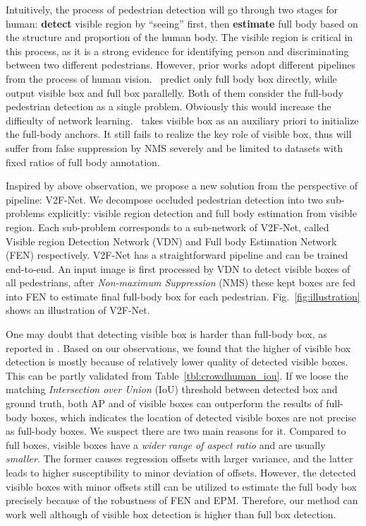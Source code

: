 \documentclass[10pt,twocolumn,letterpaper]{article}
\begin{document}
Intuitively, the process of pedestrian detection will go through two stages for human: \textbf{detect} visible region by ``seeing'' first, then \textbf{estimate} full body based on the structure and proportion of the human body. The visible region is critical in this process, as it is a strong evidence for identifying person and discriminating between two different pedestrians. However, prior works adopt different pipelines from the process of human vision.~\cite{wang2018repulsion, chu2020crowddet} predict only full body box directly, while~\cite{Zhou_2018_bibox, huang2020R2nms} output visible box and full box parallelly. Both of them consider the full-body pedestrian detection as a single problem. Obviously this would increase the difficulty of network learning.~\cite{prnet} takes visible box as an auxiliary priori to initialize the full-body anchors. It still fails to realize the
key role of visible box, thus will suffer from false suppression by NMS severely and be limited to datasets with fixed ratios of full body annotation.














Inspired by above observation, we propose a new solution from the perspective of pipeline: V2F-Net. We decompose occluded pedestrian detection into two sub-problems explicitly: visible region detection and full body estimation from visible region. Each sub-problem corresponds to a sub-network of V2F-Net, called Visible region Detection Network (VDN) and Full body Estimation Network (FEN) respectively. V2F-Net has a straightforward pipeline and can be trained end-to-end. An input image is first processed by VDN to detect visible boxes of all pedestrians, after \textit{Non-maximum Suppression} (NMS) these kept boxes are fed into FEN to estimate final full-body box for each pedestrian. Fig.~\ref{fig:illustration} shows an illustration of V2F-Net.


One may doubt that detecting visible box is harder than full-body box, as reported in \cite{shao2018crowdhuman}. Based on our observations, we found that the higher  of visible box detection is mostly because of relatively lower quality of detected visible boxes. This can be partly validated from Table~\ref{tbl:crowdhuman_iou}. If we loose the matching \textit{Intersection over Union} (IoU) threshold between detected box and ground truth, both AP and  of visible boxes can outperform the results of full-body boxes, which indicates the location of detected visible boxes are not precise as full-body boxes. We suspect there are two main reasons for it. Compared to full boxes, visible boxes have a \textit{wider range of aspect ratio} and are usually \textit{smaller}. The former causes regression offsets with larger variance, and the latter 
leads to higher susceptibility to minor deviation of offsets. However, the detected visible boxes with minor offsets still can be utilized to estimate the full body box precisely because of the robustness of FEN and EPM. Therefore, our method can work well although  of visible box detection is higher than full box detection.
\end{document}

